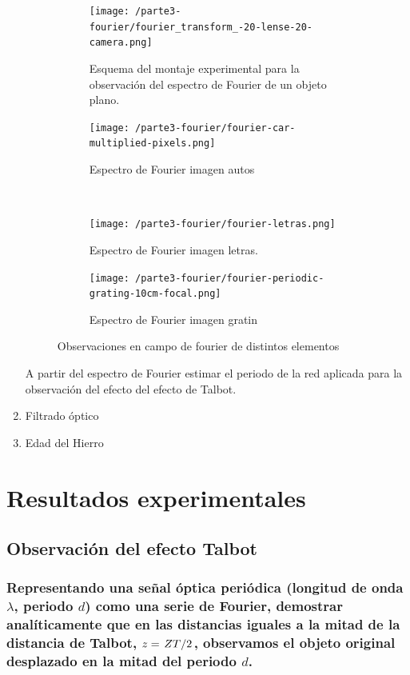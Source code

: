 \documentclass{./packages/optica-article}
\begin{document}
\begin{enumerate}
\begin{figure}[hptb]
\begin{center}
    \begin{subfigure}[t]{0.45\textwidth}\centering
        \texttt{[image: /parte3-fourier/fourier\_transform\_-20-lense-20-camera.png]}
    \caption{Esquema del montaje experimental para la observación del espectro de Fourier de un objeto plano. }
    \label{fig:fourier1}
    \end{subfigure}
	\hfill
	\begin{subfigure}[t]{0.45\textwidth}\centering
		\texttt{[image: /parte3-fourier/fourier-car-multiplied-pixels.png]}
    \caption{Espectro de Fourier imagen autos }
    \label{fig:fourier2}
	\end{subfigure}
	\\
	\begin{subfigure}[t]{0.45\textwidth}\centering
		\texttt{[image: /parte3-fourier/fourier-letras.png]}
    \caption{Espectro de Fourier imagen letras. }
    \label{fourier3}
	\end{subfigure}
	\hfill
	\begin{subfigure}[t]{0.45\textwidth}\centering
		\texttt{[image: /parte3-fourier/fourier-periodic-grating-10cm-focal.png]}
    \caption{Espectro de Fourier imagen gratin }
    \label{fourier4}
	\end{subfigure}
	
	
	\caption{Observaciones en campo de fourier de distintos elementos
	}
	\label{fig:alltalbot}
\end{center}
\end{figure}

A partir del espectro de Fourier estimar el periodo de la red aplicada para la observación del efecto del efecto de Talbot.
    \item Filtrado óptico
    \item Edad del Hierro
\end{enumerate}

\section{Resultados experimentales}

\subsection{Observación del efecto Talbot}

\subsubsection{Representando una señal óptica periódica (longitud de onda $\lambda$, periodo $d$) como una serie de Fourier, demostrar analíticamente que en las distancias iguales a la mitad de la distancia de Talbot, $z=\flatfrac{ZT}{2}$, observamos el objeto original desplazado en la mitad del periodo $d$.
}
\end{document}
